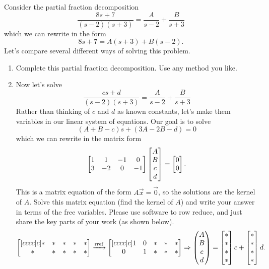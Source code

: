 \begin{problem}\label{partial fraction general solution}
Consider the partial fraction decomposition 
$$
\frac{8s+7}{(s-2)(s+3)} = \frac{A}{s-2}+\frac{B}{s+3}
$$
which we  can rewrite in the form
$$8s+7 = A(s+3)+B(s-2).$$
Let's compare several different ways of solving this problem.
\begin{enumerate}
 \item Complete this partial fraction decomposition. Use any method you like. 
 \item Now let's solve 
$$
\frac{cs+d}{(s-2)(s+3)} = \frac{A}{s-2}+\frac{B}{s+3}
$$
Rather than thinking of $c$ and $d$ as known constants, let's make them variables in our linear system of equations.  
Our goal is to solve 
$$
(A+B-c)s+(3A-2B-d)=0
$$   
which we can rewrite in the matrix form 
%
$$\begin{bmatrix} 
1 & 1 & -1 & 0 \\
3 & -2 & 0 & -1
 \end{bmatrix}\begin{bmatrix} A\\B\\c\\d \end{bmatrix}=\begin{bmatrix} 0\\0 \end{bmatrix}.$$
This is a matrix equation of the form $A\vec x=\vec 0$, so the solutions are the kernel of $A$. Solve this matrix equation (find the kernel of $A$) and write your answer in terms of the free variables. Please use software to row reduce, and just share the key parts of your work (as shown below).
$$\begin{bmatrix} [cccc|c]*&*&*&*&*\\ *&*&*&*&* \end{bmatrix}\xrightarrow{\text{rref}}\begin{bmatrix} [cccc|c]1&0&*&*&*\\ 0&1& *&*&* \end{bmatrix}\Rightarrow \begin{pmatrix} A\\B\\c\\d \end{pmatrix}=\begin{bmatrix} *\\ *\\ *\\ *  \end{bmatrix}c+\begin{bmatrix} *\\ *\\ *\\ *  \end{bmatrix}d.$$



\end{enumerate}
\end{problem}
